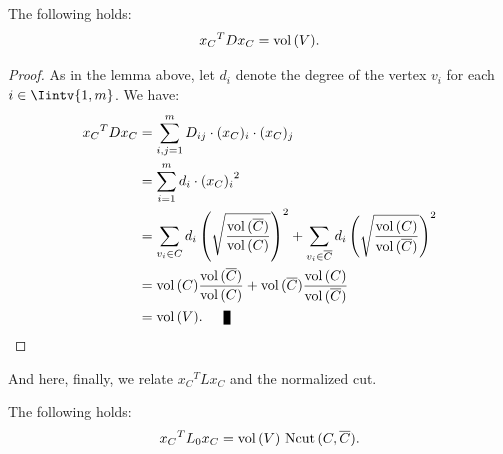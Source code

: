 \begin{lemma} \label{cond2}
   The following holds:
   \begin{equation}
      {x_C}^TDx_C = \operatorname*{vol\,} (V).
   \end{equation}
\end{lemma}

\begin{proof}
   As in the lemma above, let $d_i$ denote the degree of the vertex $v_i$ for each $i \in \Iintv{1,m}$. We have:
   \begin{equation*}
      \begin{split}
         {x_C}^T D x_C &= \sum_{i,j=1}^m D_{ij} \cdot (x_C)_i \cdot (x_C)_j \\
         &= \sum_{i=1}^m d_i \cdot {(x_C)_i}^2 \\
         &= \sum_{v_i \in C} d_i \left( \sqrt{\frac{\vol (\overline C)}{\vol (C)}} \right)^2
         + \sum_{v_i \in \overline C} d_i \left( \sqrt{\frac{\vol (C)}{\vol (\overline C)}} \right)^2 \\
         &= \vol(C) \frac{\vol (\overline C)}{\vol(C)} + \vol(\overline C) \frac{\vol (C)}{\vol ( \overline C)} \\
         &= \vol (V). \qed
      \end{split}
   \end{equation*}
\end{proof}

And here, finally, we relate ${x_C}^TL{x_C}$ and the normalized cut.

\begin{theorem}\label{xtxcut}
   The following holds:
   \begin{equation}
      {x_C}^TL_0{x_C} = \operatorname*{vol\,}(V)\, \operatorname*{Ncut\,} (C, \overline C).
   \end{equation}
\end{theorem}

